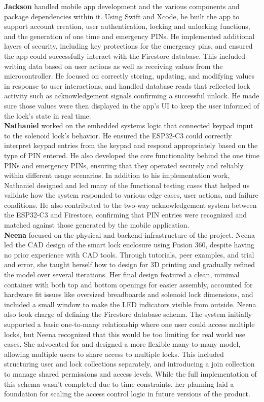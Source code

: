 \textbf{Jackson} handled mobile app development and the various components and package dependencies within it. Using Swift and Xcode, he built the app to support account creation, user authentication, locking and unlocking functions, and the generation of one time and emergency PINs. He implemented additional layers of security, including key protections for the emergency pins, and ensured the app could successfully interact with the Firestore database. This included writing data based on user actions as well as receiving values from the microcontroller. He focused on correctly storing, updating, and modifying values in response to user interactions, and handled database reads that reflected lock activity such as acknowledgement signals confirming a successful unlock. He made sure those values were then displayed in the app’s UI to keep the user informed of the lock’s state in real time. \\

\textbf{Nathaniel} worked on the embedded systems logic that connected keypad input to the solenoid lock’s behavior. He ensured the ESP32-C3 could correctly interpret keypad entries from the keypad and respond appropriately based on the type of PIN entered. He also developed the core functionality behind the one time PINs and emergency PINs, ensuring that they operated securely and reliably within different usage scenarios. In addition to his implementation work, Nathaniel designed and led many of the functional testing cases that helped us validate how the system responded to various edge cases, user actions, and failure conditions. He also contributed to the two-way acknowledgement system between the ESP32-C3 and Firestore, confirming that PIN entries were recognized and matched against those generated by the mobile application. \\

\textbf{Neena} focused on the physical and backend infrastructure of the project. Neena led the CAD design of the smart lock enclosure using Fusion 360, despite having no prior experience with CAD tools. Through tutorials, peer examples, and trial and error, she taught herself how to design for 3D printing and gradually refined the model over several iterations. Her final design featured a clean, minimal container with both top and bottom openings for easier assembly, accounted for hardware fit issues like oversized breadboards and solenoid lock dimensions, and included a small window to make the LED indicators visible from outside. Neena also took charge of defining the Firestore database schema. The system initially supported a basic one-to-many relationship where one user could access multiple locks, but Neena recognized that this would be too limiting for real world use cases. She advocated for and designed a more flexible many-to-many model, allowing multiple users to share access to multiple locks. This included structuring user and lock collections separately, and introducing a join collection to manage shared permissions and access levels. While the full implementation of this schema wasn’t completed due to time constraints, her planning laid a foundation for scaling the access control logic in future versions of the product. \\

